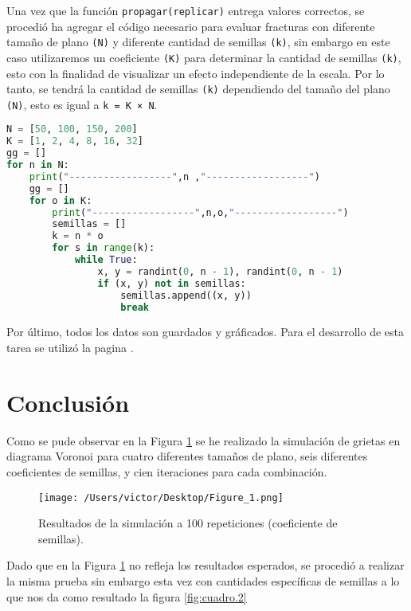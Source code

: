 \documentclass{article}
\begin{document}
Una vez que la función \texttt{propagar(replicar)} entrega valores correctos, se procedió ha agregar el código necesario para evaluar fracturas con diferente tamaño de plano \texttt{(N)} y diferente cantidad de semillas \texttt{(k)}, sin embargo en este caso utilizaremos un coeficiente \texttt{(K)} para determinar la cantidad de semillas \texttt{(k)}, esto con la finalidad de visualizar un efecto independiente de la escala. Por lo tanto, se tendrá la cantidad de semillas \texttt{(k)} dependiendo del tamaño del plano \texttt{(N)}, esto es igual a \texttt{k = K × N}.    


\begin{lstlisting}[language=Python]
N = [50, 100, 150, 200]
K = [1, 2, 4, 8, 16, 32]
gg = []
for n in N:
    print("------------------",n ,"------------------")
    gg = []
    for o in K:
        print("------------------",n,o,"------------------")
        semillas = []
        k = n * o
        for s in range(k):
            while True:
                x, y = randint(0, n - 1), randint(0, n - 1)
                if (x, y) not in semillas:
                    semillas.append((x, y))
                    break
 \end{lstlisting}


Por último, todos los datos son guardados y gráficados. Para el desarrollo de esta tarea se utilizó la pagina \citep{DRA.Code}.


\section{Conclusión}

Como se pude observar en la Figura \ref{fig:cuadro.1} se he realizado la simulación de grietas en diagrama Voronoi para cuatro diferentes tamaños de plano, seis diferentes coeficientes de semillas, y cien iteraciones para cada combinación.   



\begin{figure}[H]
\begin{center}
	\texttt{[image: /Users/victor/Desktop/Figure\_1.png]}
	\caption{ Resultados de la simulación a 100 repeticiones (coeficiente de semillas).}
	\label{fig:cuadro.1}
\end{center}
\end{figure}


Dado que en la Figura \ref{fig:cuadro.1} no refleja los resultados esperados, se procedió a realizar la misma prueba sin embargo esta vez con cantidades específicas de semillas a lo que nos da como resultado la figura  \ref{fig:cuadro.2}
\end{document}
